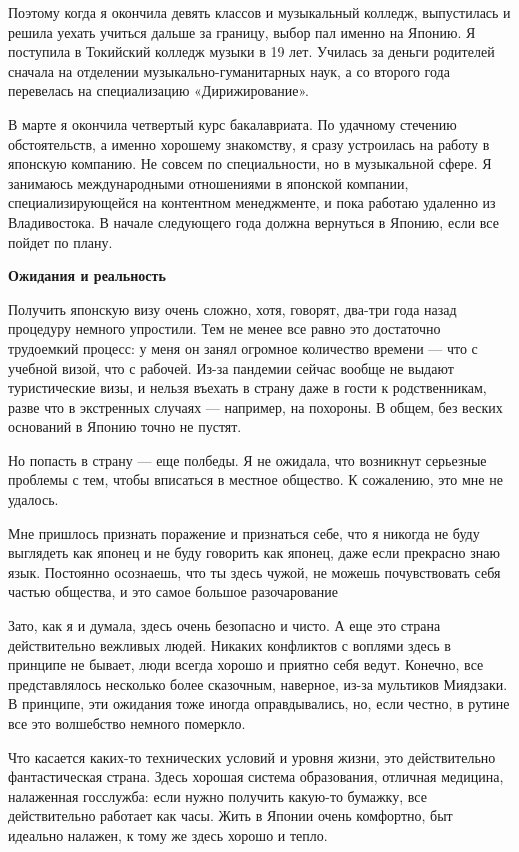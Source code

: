 Поэтому когда я окончила девять классов и музыкальный колледж, выпустилась и решила уехать учиться дальше за границу, выбор пал именно на Японию. Я поступила в Токийский колледж музыки в 19 лет. Училась за деньги родителей сначала на отделении музыкально-гуманитарных наук, а со второго года перевелась на специализацию «Дирижирование».

В марте я окончила четвертый курс бакалавриата. По удачному стечению обстоятельств, а именно хорошему знакомству, я сразу устроилась на работу в японскую компанию. Не совсем по специальности, но в музыкальной сфере. Я занимаюсь международными отношениями в японской компании, специализирующейся на контентном менеджменте, и пока работаю удаленно из Владивостока. В начале следующего года должна вернуться в Японию, если все пойдет по плану.

\textbf{Ожидания и реальность}

Получить японскую визу очень сложно, хотя, говорят, два-три года назад процедуру немного упростили. Тем не менее все равно это достаточно трудоемкий процесс: у меня он занял огромное количество времени — что с учебной визой, что с рабочей. Из-за пандемии сейчас вообще не выдают туристические визы, и нельзя въехать в страну даже в гости к родственникам, разве что в экстренных случаях — например, на похороны. В общем, без веских оснований в Японию точно не пустят.

Но попасть в страну — еще полбеды. Я не ожидала, что возникнут серьезные проблемы с тем, чтобы вписаться в местное общество. К сожалению, это мне не удалось.

\begin{fancyquotes}
    Мне пришлось признать поражение и признаться себе, что я никогда не буду выглядеть как японец и не буду говорить как японец, даже если прекрасно знаю язык. Постоянно осознаешь, что ты здесь чужой, не можешь почувствовать себя частью общества, и это самое большое разочарование
\end{fancyquotes}

Зато, как я и думала, здесь очень безопасно и чисто. А еще это страна действительно вежливых людей. Никаких конфликтов с воплями здесь в принципе не бывает, люди всегда хорошо и приятно себя ведут. Конечно, все представлялось несколько более сказочным, наверное, из-за мультиков Миядзаки. В принципе, эти ожидания тоже иногда оправдывались, но, если честно, в рутине все это волшебство немного померкло.

Что касается каких-то технических условий и уровня жизни, это действительно фантастическая страна. Здесь хорошая система образования, отличная медицина, налаженная госслужба: если нужно получить какую-то бумажку, все действительно работает как часы. Жить в Японии очень комфортно, быт идеально налажен, к тому же здесь хорошо и тепло.

